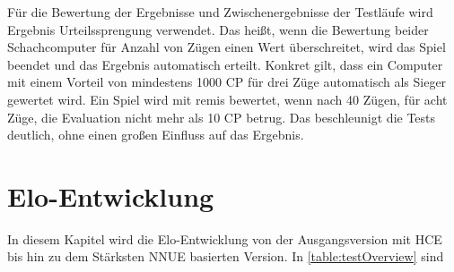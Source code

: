 Für die Bewertung der Ergebnisse und Zwischenergebnisse der Testläufe wird Ergebnis Urteilssprengung verwendet. Das heißt, wenn die Bewertung beider Schachcomputer für Anzahl von Zügen einen Wert überschreitet, wird das Spiel beendet und das Ergebnis automatisch erteilt. Konkret gilt, dass ein Computer mit einem Vorteil von mindestens 1000 \ac{CP} für drei Züge automatisch als Sieger gewertet wird. Ein Spiel wird mit remis bewertet, wenn nach 40 Zügen, für acht Züge, die Evaluation nicht mehr als 10 \ac{CP} betrug. Das beschleunigt die Tests deutlich, ohne einen großen Einfluss auf das Ergebnis.

\section{Elo-Entwicklung}

In diesem Kapitel wird die Elo-Entwicklung von der Ausgangsversion mit \ac{HCE} bis hin zu dem Stärksten \ac{NNUE} basierten Version. In \autoref{table:testOverview} sind

